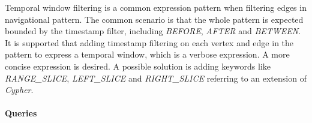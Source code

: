 
Temporal window filtering is a common expression pattern when filtering edges in navigational pattern. The common scenario is that the whole pattern is expected bounded by the timestamp filter, including \emph{BEFORE}, \emph{AFTER} and \emph{BETWEEN}. It is supported that adding timestamp filtering on each vertex and edge in the pattern to express a temporal window, which is a verbose expression. A more concise expression is desired. A possible solution is adding keywords like \emph{RANGE\_SLICE}, \emph{LEFT\_SLICE} and \emph{RIGHT\_SLICE} referring to an extension of \emph{Cypher}\cite{tcypher}.


\paragraph{Queries}
{\raggedright

}
